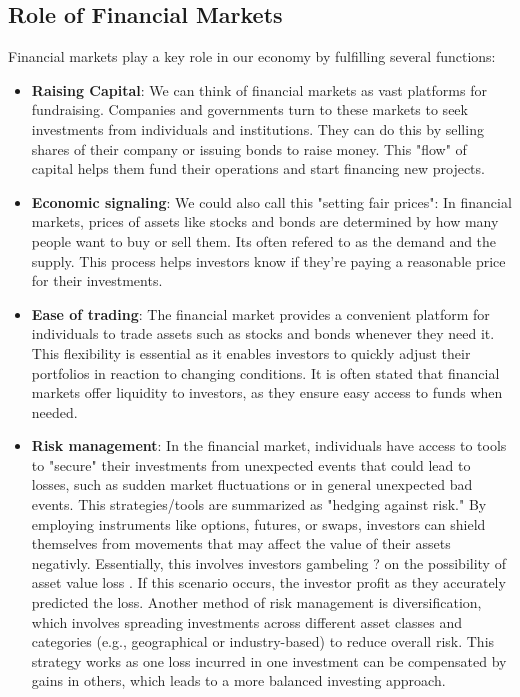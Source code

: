 \documentclass{article}
\begin{document}
\subsection{Role of Financial Markets} 
Financial markets play a key role in our economy by fulfilling several functions:
\begin{itemize}
    \item \textbf{Raising Capital}:
    We can think of financial markets as vast platforms for fundraising. Companies and governments turn to these markets to seek investments from individuals and institutions. They can do this by selling shares of their company or issuing bonds to raise money. This "flow" of capital helps them fund their operations and start financing  new projects.
    
    \item \textbf{Economic signaling}: We could also call this "setting fair prices": In financial markets, prices of assets like stocks and bonds are determined by how many people want to buy or sell them. Its often refered to as the demand and the supply. This process helps investors know if they're paying a reasonable price for their investments.
    
    \item \textbf{Ease of trading}: The financial market provides a convenient platform for individuals to trade assets such as stocks and bonds whenever they need it. This flexibility is essential as it enables investors to quickly adjust their portfolios in reaction to changing conditions. It is often stated that financial markets offer liquidity to investors, as they ensure easy access to funds when needed.
    
    \item \textbf{Risk management}: In the financial market, individuals have access to tools to "secure" their investments from unexpected events that could lead to losses, such as sudden market fluctuations or in general unexpected bad events. This strategies/tools are summarized as "hedging against risk." By employing instruments like options, futures, or swaps, investors can shield themselves from  movements that may affect the value of their assets negativly. Essentially, this involves investors gambeling ? on the possibility of asset value loss . If this scenario occurs, the investor profit as they accurately predicted the loss. Another method of risk management is diversification, which involves spreading investments across different asset classes and categories (e.g., geographical or industry-based) to reduce overall risk. This strategy works as one loss incurred in one investment can be compensated by gains in others, which leads to a more balanced investing approach.
    

\end{itemize}
\end{document}
